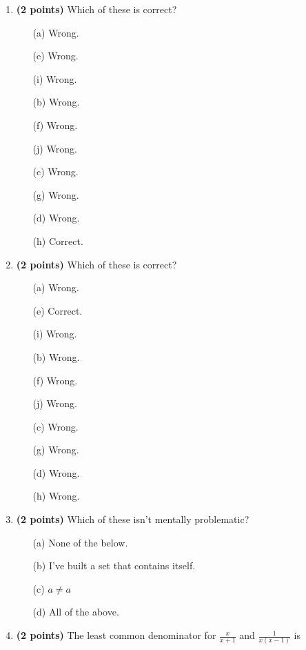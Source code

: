 \documentclass[12pt]{amsart}
\begin{document}
\newpage
\begin{enumerate}
\item {\bf (2 points)} 
 Which of these is correct?

\begin{minipage}[t]{1.0\linewidth}\begin{multicols}{4}\begin{itemize}\item[(a)]  Wrong. \item[(e)]  Wrong. \item[(i)]  Wrong. \item[(b)]  Wrong. \item[(f)]  Wrong. \item[(j)]  Wrong. \item[(c)]  Wrong. \item[(g)]  Wrong. \item[] \item[(d)]  Wrong. \item[(h)]  Correct. \item[] \end{itemize}\end{multicols}\end{minipage} \vfill 
\item {\bf (2 points)} 
 Which of these is correct?

\begin{minipage}[t]{1.0\linewidth}\begin{multicols}{4}\begin{itemize}\item[(a)]  Wrong. \item[(e)]  Correct. \item[(i)]  Wrong. \item[(b)]  Wrong. \item[(f)]  Wrong. \item[(j)]  Wrong. \item[(c)]  Wrong. \item[(g)]  Wrong. \item[] \item[(d)]  Wrong. \item[(h)]  Wrong. \item[] \end{itemize}\end{multicols}\end{minipage} \vfill 
\item {\bf (2 points)} 
 Which of these isn't mentally problematic?

\begin{minipage}[t]{1.0\linewidth}\begin{itemize}\item[(a)]  None of the below.  \item[(b)]  I've built a set that contains itself. \item[(c)]  $a \neq a$ \item[(d)]   All of the above. \end{itemize}\end{minipage} \vfill 
\item {\bf (2 points)} 
 The least common denominator for $\displaystyle \frac{x}{x+1}$ and $\displaystyle \frac{1}{x(x-1)}$ is \vspace{.2cm}


\end{enumerate}
\end{document}
